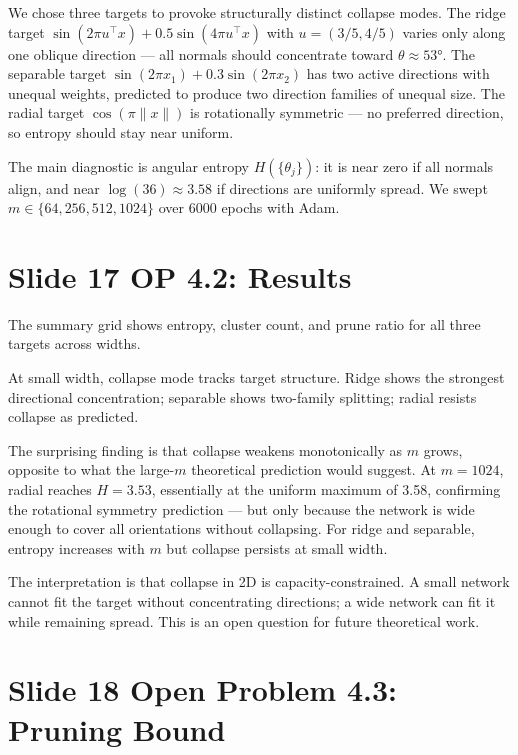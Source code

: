 \documentclass[11pt]{article}
\begin{document}
We chose three targets to provoke structurally distinct collapse modes.
The ridge target $\sin(2\pi u^\top x) + 0.5\sin(4\pi u^\top x)$ with $u = (3/5, 4/5)$ varies only along one oblique direction --- all normals should concentrate toward $\theta \approx 53°$.
The separable target $\sin(2\pi x_1) + 0.3\sin(2\pi x_2)$ has two active directions with unequal weights, predicted to produce two direction families of unequal size.
The radial target $\cos(\pi\|x\|)$ is rotationally symmetric --- no preferred direction, so entropy should stay near uniform.

The main diagnostic is angular entropy $H(\{\theta_j\})$: it is near zero if all normals align, and near $\log(36) \approx 3.58$ if directions are uniformly spread.
We swept $m \in \{64, 256, 512, 1024\}$ over 6000 epochs with Adam.

\section*{Slide 17 \quad OP 4.2: Results}

The summary grid shows entropy, cluster count, and prune ratio for all three targets across widths.

At small width, collapse mode tracks target structure.
Ridge shows the strongest directional concentration; separable shows two-family splitting; radial resists collapse as predicted.

The surprising finding is that collapse weakens monotonically as $m$ grows, opposite to what the large-$m$ theoretical prediction would suggest.
At $m = 1024$, radial reaches $H = 3.53$, essentially at the uniform maximum of 3.58, confirming the rotational symmetry prediction --- but only because the network is wide enough to cover all orientations without collapsing.
For ridge and separable, entropy increases with $m$ but collapse persists at small width.

The interpretation is that collapse in 2D is capacity-constrained.
A small network cannot fit the target without concentrating directions; a wide network can fit it while remaining spread.
This is an open question for future theoretical work.

\section*{Slide 18 \quad Open Problem 4.3: Pruning Bound}
\end{document}
